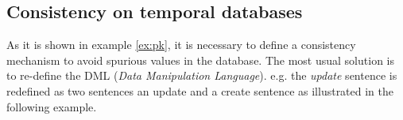 \begin{example}
\begin{table}


\end{table}


\end{example}

\subsection{\label{subsubsec:consistency}Consistency on temporal databases}
As it is shown in example \ref{ex:pk}, it  is necessary to define a consistency mechanism to avoid spurious values in the database. The most usual solution is to re-define the DML (\emph{Data Manipulation Language}). e.g. the \emph{update} sentence is redefined as two sentences an update and a create sentence as illustrated in the following example.

